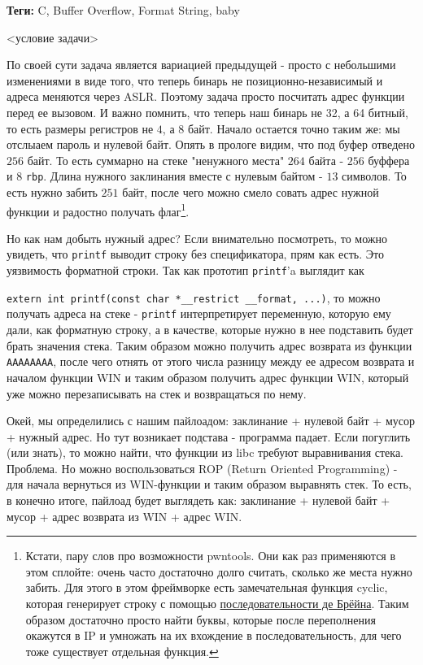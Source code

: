 \documentclass[idxtotoc,hyperref,openany,oneside]{files/pwn} %
\begin{document}


\textbf{Теги:} C, Buffer Overflow, Format String, baby\vspace{\baselineskip}

\begin{tcolorbox}
<условие задачи>
\end{tcolorbox}

По своей сути задача является вариацией предыдущей - просто с небольшими изменениями в виде того, что теперь бинарь не позиционно-независимый и адреса меняются через ASLR. Поэтому задача просто посчитать адрес функции перед ее вызовом. И важно помнить, что теперь наш бинарь не 32, а 64 битный, то есть размеры регистров не $4$, а $8$ байт.
Начало остается точно таким же: мы отслыаем пароль и нулевой байт. Опять в прологе видим, что под буфер отведено $256$ байт. То есть суммарно на стеке "ненужного места" $264$ байта - $256$ буффера и $8$ \verb|rbp|. Длина нужного заклинания вместе с нулевым байтом - $13$ символов. То есть нужно забить $251$ байт, после чего можно смело совать адрес нужной функции и радостно получать флаг\footnote{Кстати, пару слов про возможности pwntools. Они как раз применяются в этом сплойте: очень часто достаточно долго считать, сколько же места нужно забить. Для этого в этом фреймворке есть замечательная функция cyclic, которая генерирует строку с помощью \href{https://en.wikipedia.org/wiki/De_Bruijn_sequence}{последовательности де Брёйна}. Таким образом достаточно просто найти буквы, которые после переполнения окажутся в IP и умножать на их вхождение в последовательность, для чего тоже существует отдельная функция.}.

Но как нам добыть нужный адрес? Если внимательно посмотреть, то можно увидеть, что \verb|printf| выводит строку без спецификатора, прям как есть. Это уязвимость форматной строки. Так как прототип \verb|printf|'a выглядит как 

\verb|extern int printf(const char *__restrict __format, ...)|, то можно получать адреса на стеке - \verb|printf| интерпретирует переменную, которую ему дали, как форматную строку, а в качестве, которые нужно в нее подставить будет брать значения стека. Таким образом можно получить адрес возврата из функции \verb|AAAAAAAA|, после чего отнять от этого числа разницу между ее адресом возврата и началом функции WIN и таким образом получить адрес функции WIN, который уже можно перезаписывать на стек и возвращаться по нему.

Окей, мы определились с нашим пайлоадом: заклинание + нулевой байт + мусор + нужный адрес. Но тут возникает подстава - программа падает. Если погуглить (или знать), то можно найти, что функции из libc требуют выравнивания стека. Проблема. Но можно воспользоваться ROP (Return Oriented Programming) - для начала вернуться из WIN-функции и таким образом выравнять стек. То есть, в конечно итоге, пайлоад будет выглядеть как: заклинание + нулевой байт + мусор + адрес возврата из WIN + адрес WIN.
\end{document}
